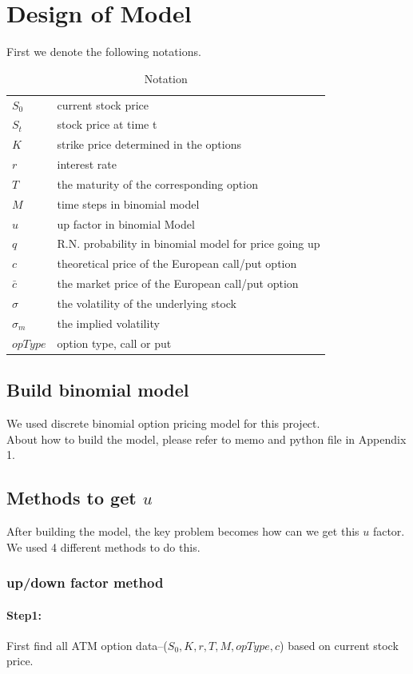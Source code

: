 \section{Design of Model}
First we denote the following notations.
\begin{table}[H]
\centering
\caption{Notation}
\label{not}
\begin{tabular}{l|l}
\hline
$S_0$& current stock price\\
$S_t$& stock price at time t\\
$K$& strike price determined in the options\\
$r$& interest rate\\
$T$& the maturity of the corresponding option\\
$M$& time steps in binomial model\\
$u$& up factor in binomial Model\\
$q$& R.N. probability in binomial model for price going up\\
$c$& theoretical price of the European call/put option\\
$\bar{c}$& the market price of the European call/put option\\
$\sigma$& the volatility of the underlying stock\\
$\sigma_m$& the implied volatility \\
$opType$& option type, call or put\\
\hline
\end{tabular}
\end{table}\noindent
\subsection{Build binomial model}
We used discrete binomial option pricing model for this project.\\
About how to build the model, please refer to memo and python file in Appendix 1.
\subsection{Methods to get $u$}
After building the model, the key problem becomes how can we get this $u$ factor. We used 4 different methods to do this. 
\subsubsection{up/down factor method}
\paragraph{Step1:} First find all ATM option data--($S_0,K,r,T,M,opType,c$) based on current stock price.
